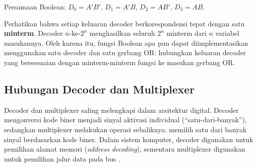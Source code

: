 Persamaan Boolean: $D_0 = A'B'$, $D_1 = A'B$, $D_2 = AB'$, $D_3 = AB$.

\begin{catatan}
Perhatikan bahwa setiap keluaran decoder berkorespondensi tepat dengan satu \textbf{minterm}. Decoder $n$-ke-$2^n$ menghasilkan seluruh $2^n$ minterm dari $n$ variabel masukannya. Oleh karena itu, fungsi Boolean apa pun dapat diimplementasikan menggunakan satu decoder dan satu gerbang OR: hubungkan keluaran decoder yang bersesuaian dengan minterm-minterm fungsi ke masukan gerbang OR.
\end{catatan}

\subsection{Hubungan Decoder dan Multiplexer}

Decoder dan multiplexer saling melengkapi dalam arsitektur digital. Decoder mengonversi kode biner menjadi sinyal aktivasi individual (``satu-dari-banyak''), sedangkan multiplexer melakukan operasi sebaliknya: memilih satu dari banyak sinyal berdasarkan kode biner. Dalam sistem komputer, decoder digunakan untuk pemilihan alamat memori (\textit{address decoding}), sementara multiplexer digunakan untuk pemilihan jalur data pada bus \cite{wiki_multiplexer}.
